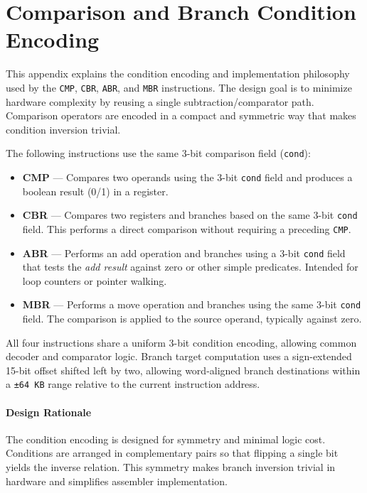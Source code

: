 \section*{Comparison and Branch Condition Encoding}

This appendix explains the condition encoding and implementation philosophy used by the \texttt{CMP}, \texttt{CBR}, \texttt{ABR}, and \texttt{MBR} instructions. The design goal is to minimize hardware complexity by reusing a single subtraction/comparator path. Comparison operators are encoded in a compact and symmetric way that makes condition inversion trivial.

The following instructions use the same 3-bit comparison field (\texttt{cond}):

\begin{itemize}
  \item \textbf{CMP} — Compares two operands using the 3-bit \texttt{cond} field and produces a boolean result (0/1) in a register.
  \item \textbf{CBR} — Compares two registers and branches based on the same 3-bit \texttt{cond} field. This performs a direct comparison without requiring a preceding \texttt{CMP}.
  \item \textbf{ABR} — Performs an add operation and branches using a 3-bit \texttt{cond} field that tests the \emph{add result} against zero or other simple predicates. Intended for loop counters or pointer walking.
  \item \textbf{MBR} — Performs a move operation and branches using the same 3-bit \texttt{cond} field. The comparison is applied to the source operand, typically against zero.
\end{itemize}

All four instructions share a uniform 3-bit condition encoding, allowing common decoder and comparator logic.  
Branch target computation uses a sign-extended 15-bit offset shifted left by two, allowing word-aligned branch destinations within a \texttt{±64\,KB} range relative to the current instruction address.

\paragraph{Design Rationale}

The condition encoding is designed for symmetry and minimal logic cost. Conditions are arranged in complementary pairs so that flipping a single bit yields the inverse relation. This symmetry makes branch inversion trivial in hardware and simplifies assembler implementation.

